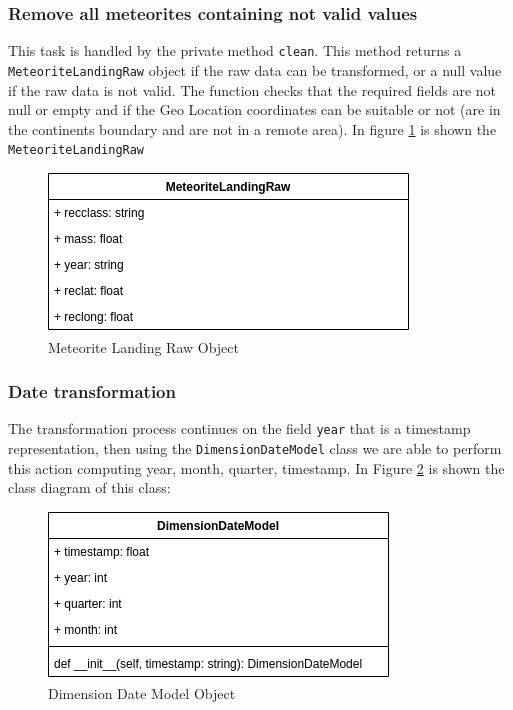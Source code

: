 \documentclass[conference]{IEEEtran}
\begin{document}
	\subsubsection{Remove all meteorites containing not valid values}
	This task is handled by the private method \texttt{clean}. This method returns a \texttt{MeteoriteLandingRaw} object if the raw data can be transformed, or a null value if the raw data is not valid. The function checks that the required fields are not null or empty and if the Geo Location coordinates can be suitable or not (are in the continents boundary and are not in a remote area).
	In figure \ref{fig:MeteoriteLandingRaw} is shown the \texttt{MeteoriteLandingRaw}
	\begin{figure}[htpb]
		\centering
		\includegraphics[width=\columnwidth]{images/meteorite_landing_raw.png}
		\caption{Meteorite Landing Raw Object}
		\label{fig:MeteoriteLandingRaw}
	\end{figure}
	
	\subsubsection{Date transformation}
	The transformation process continues on the field \texttt{year} that is a timestamp representation, then using the \texttt{DimensionDateModel} class we are able to perform this action computing year, month, quarter, timestamp. In Figure \ref{fig:DimensionDateModel} is shown the class diagram of this class:
	\begin{figure}[htpb]
		\centering
		\includegraphics[width=\columnwidth]{images/dimension_date_model.png}
		\caption{Dimension Date Model Object}
		\label{fig:DimensionDateModel}
	\end{figure}
	
\end{document}
